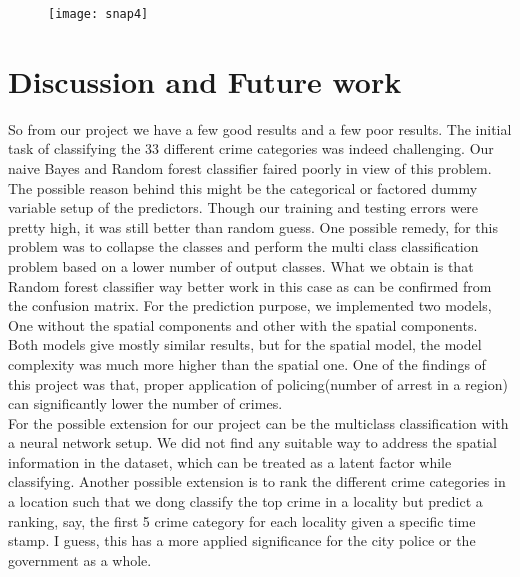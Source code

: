 \documentclass[conference]{IEEEtran}
\begin{document}
  
	\begin{figure}[H]		
	\texttt{[image: snap4]} 
	
\end{figure}
\section{Discussion and Future work}
So from our project we have a few good results and a few poor results. The initial task of classifying the 33 different crime categories was indeed challenging. Our naive Bayes and Random forest classifier faired poorly in view of this problem. The possible reason behind this might be the categorical or factored dummy variable setup of the predictors. Though our training and testing errors were pretty high, it was still better than random guess. One possible remedy, for this problem was to collapse the classes and perform the multi class classification problem based on a lower number of output classes. What we obtain is that Random forest classifier way better work in this case as can be confirmed from the confusion matrix. For the prediction purpose, we implemented two models, One without the spatial components and other with the spatial components. Both models give mostly similar results, but for the spatial model, the model complexity was much more higher than the spatial one. One of the findings of this project was that, proper application of policing(number of arrest in a region) can significantly lower the number of crimes.\\
For the possible extension for our project can be the multiclass classification with a neural network setup. We did not find any suitable way to address the spatial information in the dataset, which can be treated as a latent factor while classifying. Another possible extension is to rank the different crime categories in a location such that we dong classify the top crime in a locality but predict a ranking, say, the first 5 crime category for each locality given a specific time stamp. I guess, this has a more applied significance for the city police or the government as a whole.          
\end{document}
